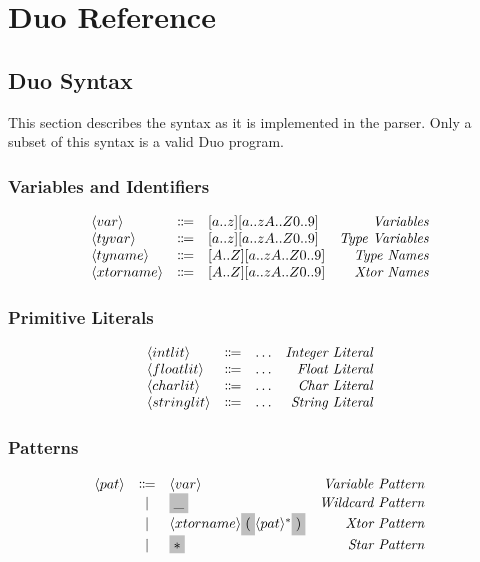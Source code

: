 \documentclass[11pt]{article}
\newcommand{\nonterminal}[1]{\langle #1 \rangle}
\newcommand{\terminal}[1]{\colorbox{lightgray}{\vphantom{X}#1}}
\begin{document}
\section{Duo Reference}

\subsection{Duo Syntax}
This section describes the syntax as it is implemented in the parser.
Only a subset of this syntax is a valid Duo program.

\subsubsection{Variables and Identifiers}
\[
  \begin{array}{lclr}
    \nonterminal{var} & \Coloneqq & [a..z][a..zA..Z0..9] & \emph{Variables} \\
    \nonterminal{tyvar} & \Coloneqq & [a..z][a..zA..Z0..9] & \emph{Type Variables} \\
    \nonterminal{tyname} & \Coloneqq & [A..Z][a..zA..Z0..9] & \emph{Type Names} \\
    \nonterminal{xtorname} & \Coloneqq & [A..Z][a..zA..Z0..9] & \emph{Xtor Names} \\
  \end{array}
\]

\subsubsection{Primitive Literals}
\[
  \begin{array}{lclr}
    \nonterminal{intlit} & \Coloneqq & \ldots & \emph{Integer Literal} \\
    \nonterminal{floatlit} & \Coloneqq & \ldots & \emph{Float Literal} \\
    \nonterminal{charlit} & \Coloneqq & \ldots & \emph{Char Literal} \\
    \nonterminal{stringlit} & \Coloneqq & \ldots & \emph{String Literal} \\
  \end{array}
\]

\subsubsection{Patterns}
\[
  \begin{array}{lclr}
    \nonterminal{pat} & \Coloneqq & \nonterminal{var} & \emph{Variable Pattern} \\
    & | & \terminal{\_} & \emph{Wildcard Pattern} \\
    & | & \nonterminal{xtorname}\terminal{(}\nonterminal{pat}^{\ast} \terminal{)} & \emph{Xtor Pattern}\\
    & | & \terminal{$\ast$} & \emph{Star Pattern} \\
  \end{array}
\]
\end{document}
